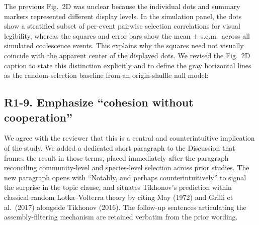 \responselabel
The previous Fig.~2D was unclear because the individual dots and summary markers represented different display levels. In the simulation panel, the dots show a stratified subset of per-event pairwise selection correlations for visual legibility, whereas the squares and error bars show the mean $\pm$ s.e.m.\ across all simulated coalescence events. This explains why the squares need not visually coincide with the apparent center of the displayed dots. We revised the Fig.~2D caption to state this distinction explicitly and to define the gray horizontal lines as the random-selection baseline from an origin-shuffle null model: 


\subsection*{R1-9. Emphasize ``cohesion without cooperation''}


\responselabel
We agree with the reviewer that this is a central and counterintuitive implication of the study. We added a dedicated short paragraph to the Discussion that frames the result in those terms, placed immediately after the paragraph reconciling community-level and species-level selection across prior studies. The new paragraph opens with ``Notably, and perhaps counterintuitively'' to signal the surprise in the topic clause, and situates Tikhonov's prediction within classical random Lotka--Volterra theory by citing May (1972) and Grilli et al.\ (2017) alongside Tikhonov (2016). The follow-up sentences articulating the assembly-filtering mechanism are retained verbatim from the prior wording.

